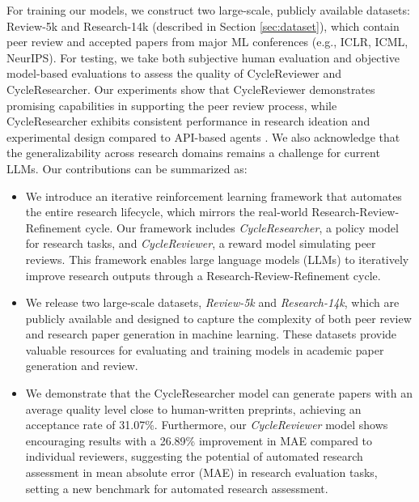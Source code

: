 \documentclass{article} %
\begin{document}
For training our models, we construct two large-scale, publicly available datasets: Review-5k and Research-14k (described in Section \ref{sec:dataset}), which contain peer review and accepted papers from major ML conferences (e.g., ICLR, ICML, NeurIPS). For testing, we take both subjective human evaluation and objective model-based evaluations to assess the quality of CycleReviewer and CycleResearcher. Our experiments show that CycleReviewer demonstrates promising capabilities in supporting the peer review process, while CycleResearcher exhibits consistent performance in research ideation and experimental design compared to API-based agents \citep{lu2024ai}. We also acknowledge that the generalizability across research domains remains a challenge for current LLMs. Our contributions can be summarized as:


\begin{itemize}[leftmargin=2em]
\setlength\itemsep{0em}
    \item We introduce an iterative reinforcement learning framework that automates the entire research lifecycle, which mirrors the real-world Research-Review-Refinement cycle. Our framework includes \textit{CycleResearcher}, a policy model for research tasks, and \textit{CycleReviewer}, a reward model simulating peer reviews. This framework enables large language models (LLMs) to iteratively improve research outputs through a Research-Review-Refinement cycle.
    
    \item We release two large-scale datasets, \textit{Review-5k} and \textit{Research-14k}, which are publicly available and designed to capture the complexity of both peer review and research paper generation in machine learning. These datasets provide valuable resources for evaluating and training models in academic paper generation and review.
    
    \item We demonstrate that the CycleResearcher model can generate papers with an average quality level close to human-written preprints, achieving an acceptance rate of 31.07\%. Furthermore, our \textit{CycleReviewer} model shows encouraging results with a 26.89\% improvement in MAE compared to individual reviewers, suggesting the potential of automated research assessment in mean absolute error (MAE) in research evaluation tasks, setting a new benchmark for automated research assessment.
\end{itemize}

\end{document}
